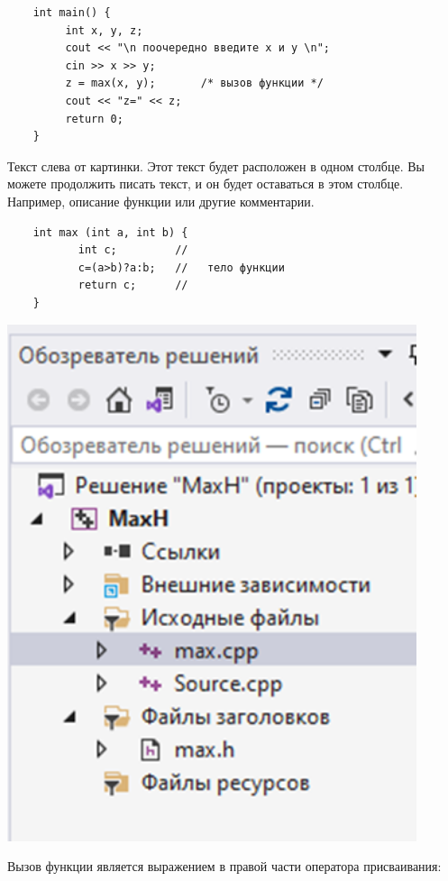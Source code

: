 \documentclass[14pt,a4paper]{article}
\begin{document}
\begin{enumerate}
\begin{verbatim}
    int main() {
         int x, y, z;
         cout << "\n поочередно введите х и у \n";
         cin >> x >> y;
         z = max(x, y);       /* вызов функции */
         cout << "z=" << z;
         return 0;
    }
    \end{verbatim}
    \begin{minipage}{0.76\textwidth}
    \item Текст слева от картинки. Этот текст будет расположен в одном столбце. Вы
      можете продолжить писать текст, и он будет оставаться в этом столбце.
      Например, описание функции или другие комментарии.
    \begin{verbatim}
    int max (int a, int b) {
           int с;         //
           c=(a>b)?a:b;   //   тело функции 
           return с;      //              
    }
    \end{verbatim}
    \end{minipage}%
    \begin{minipage}{0.24\textwidth}
      \raggedleft
      \includegraphics[width=0.90\textwidth]{data/condition20_1_2.png}  %
    \end{minipage}
    Вызов функции является выражением в правой части оператора присваивания: 

\end{enumerate}
\end{document}
